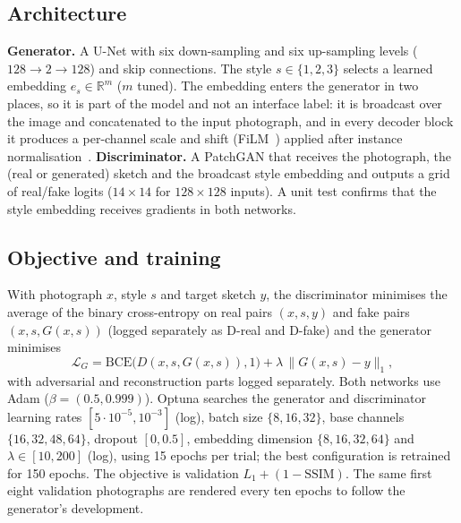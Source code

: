 \documentclass[conference]{IEEEtran}
\newcommand{\Ltwo}{\ensuremath{\mathcal{L}}}
\begin{document}
\subsection{Architecture}
\textbf{Generator.} A U-Net with six down-sampling and six up-sampling levels ($128\to2\to128$) and skip connections. The style $s\in\{1,2,3\}$ selects a learned embedding $e_s\in\mathbb{R}^{m}$ ($m$ tuned). The embedding enters the generator in two places, so it is part of the model and not an interface label:
it is broadcast over the image and concatenated to the input photograph, and in every decoder block it produces a per-channel scale and shift (FiLM~\cite{perez2018}) applied after instance normalisation~\cite{ulyanov2016}.
\textbf{Discriminator.} A PatchGAN that receives the photograph, the (real or generated) sketch and the broadcast style embedding and outputs a grid of real/fake logits ($14\times14$ for $128\times128$ inputs). A unit test confirms that the style embedding receives gradients in both networks.

\subsection{Objective and training}
With photograph $x$, style $s$ and target sketch $y$, the discriminator minimises the average of the binary cross-entropy on real pairs $(x,s,y)$ and fake pairs $(x,s,G(x,s))$ (logged separately as D-real and D-fake) and the generator minimises
\begin{equation}
\Ltwo_G=\mathrm{BCE}\bigl(D(x,s,G(x,s)),1\bigr)+\lambda\,\lVert G(x,s)-y\rVert_1 ,
\end{equation}
with adversarial and reconstruction parts logged separately. Both networks use Adam ($\beta=(0.5,0.999)$). Optuna searches the generator and discriminator learning rates $[5\cdot10^{-5},10^{-3}]$ (log), batch size $\{8,16,32\}$, base channels $\{16,32,48,64\}$, dropout $[0,0.5]$,
embedding dimension $\{8,16,32,64\}$ and $\lambda\in[10,200]$ (log), using 15 epochs per trial; the best configuration is retrained for 150 epochs. The objective is validation $L_1+(1-\mathrm{SSIM})$.
The same first eight validation photographs are rendered every ten epochs to follow the generator's development.
\end{document}
